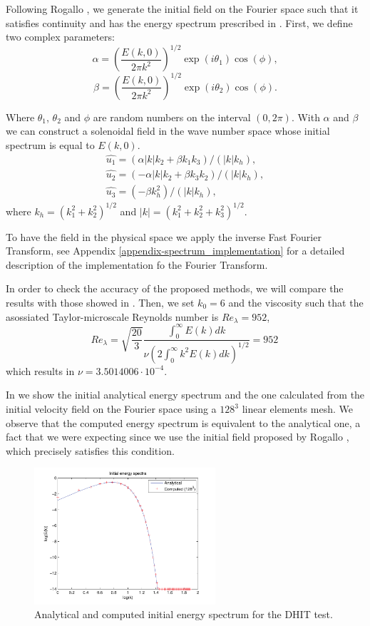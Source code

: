 Following Rogallo \cite{rogallo_numerical_1981}, we generate the initial field on the Fourier space such that it satisfies continuity and has the energy spectrum prescribed in  . First, we define two complex parameters:
$$\alpha=\left(\frac{E(k,0)}{2\pi k^2}\right)^{1/2}\exp(i\theta_1)\cos(\phi),$$
$$\beta=\left(\frac{E(k,0)}{2\pi k^2}\right)^{1/2}\exp(i\theta_2)\cos(\phi).$$

Where $\theta_1$, $\theta_2$ and $\phi$ are random numbers on the interval $(0,2\pi)$. With $\alpha$ and $\beta$ we can construct a solenoidal field in the wave number space whose initial spectrum is equal to $E(k,0)$.
\begin{align}
\label{eq-DHIT_initial_u_fourier}
\hat{u_1}=(\alpha|k|k_2+\beta k_1k_3)/(|k|k_h),\\\nonumber
\hat{u_2}=(-\alpha|k|k_2+\beta k_3k_2)/(|k|k_h),\\\nonumber
\hat{u_3}=(-\beta k_h^2)/(|k|k_h),
\end{align}
where $k_h=\left(k_1^2+k_2^2\right)^{1/2}$ and $|k|=\left(k_1^2+k_2^2+k_3^2\right)^{1/2}$.

To have the field  in the physical space we apply the inverse Fast Fourier Transform, see Appendix \ref{appendix-spectrum_implementation} for a detailed description of the implementation fo the Fourier Transform.

In order to check the accuracy of the proposed methods, we will compare the results with those showed in \cite{_selection_????}. Then, we set $k_0=6$ and the viscosity such that the asossiated Taylor-microscale Reynolds number is $Re_\lambda=952$,
$$Re_\lambda=\sqrt{\frac{20}{3}}\frac{\int_0^\infty E(k)dk}{\nu\left(2\int_0^\infty k^2E(k)dk\right)^{1/2}}=952\,$$
which results in $\nu=3.5014006\cdot 10^{-4}$.

In  we show the initial analytical energy spectrum and the one calculated from the initial velocity field on the Fourier space  using a $128^3$ linear elements mesh. We observe that the computed energy spectrum is equivalent to the analytical one, a fact that we were expecting since we use the initial field proposed by Rogallo \cite{rogallo_numerical_1981}, which precisely satisfies this condition.
\begin{figure}[h!]
	\centering	
	\includegraphics[width=0.6\textwidth]{Figures/Chapter3/DHIT_initial_energy}
	\caption{Analytical and computed initial energy spectrum for the DHIT test.}
	\label{fig-DHIT_initial_spectrum}
\end{figure}


